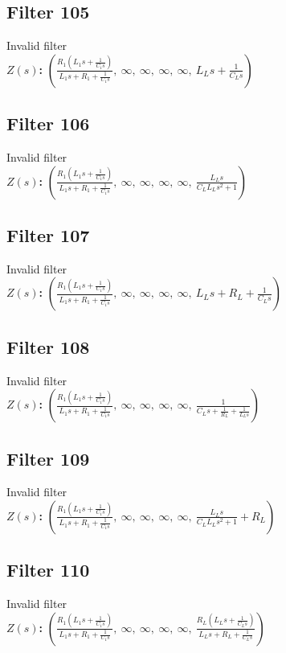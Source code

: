 \documentclass{article}
\begin{document}
\subsection*{Filter 105}
Invalid filter \\ 
\textbf{$Z(s)$:} $\left( \frac{R_{1} \left(L_{1} s + \frac{1}{C_{1} s}\right)}{L_{1} s + R_{1} + \frac{1}{C_{1} s}}, \  \infty, \  \infty, \  \infty, \  \infty, \  L_{L} s + \frac{1}{C_{L} s}\right)$ \\ 
\subsection*{Filter 106}
Invalid filter \\ 
\textbf{$Z(s)$:} $\left( \frac{R_{1} \left(L_{1} s + \frac{1}{C_{1} s}\right)}{L_{1} s + R_{1} + \frac{1}{C_{1} s}}, \  \infty, \  \infty, \  \infty, \  \infty, \  \frac{L_{L} s}{C_{L} L_{L} s^{2} + 1}\right)$ \\ 
\subsection*{Filter 107}
Invalid filter \\ 
\textbf{$Z(s)$:} $\left( \frac{R_{1} \left(L_{1} s + \frac{1}{C_{1} s}\right)}{L_{1} s + R_{1} + \frac{1}{C_{1} s}}, \  \infty, \  \infty, \  \infty, \  \infty, \  L_{L} s + R_{L} + \frac{1}{C_{L} s}\right)$ \\ 
\subsection*{Filter 108}
Invalid filter \\ 
\textbf{$Z(s)$:} $\left( \frac{R_{1} \left(L_{1} s + \frac{1}{C_{1} s}\right)}{L_{1} s + R_{1} + \frac{1}{C_{1} s}}, \  \infty, \  \infty, \  \infty, \  \infty, \  \frac{1}{C_{L} s + \frac{1}{R_{L}} + \frac{1}{L_{L} s}}\right)$ \\ 
\subsection*{Filter 109}
Invalid filter \\ 
\textbf{$Z(s)$:} $\left( \frac{R_{1} \left(L_{1} s + \frac{1}{C_{1} s}\right)}{L_{1} s + R_{1} + \frac{1}{C_{1} s}}, \  \infty, \  \infty, \  \infty, \  \infty, \  \frac{L_{L} s}{C_{L} L_{L} s^{2} + 1} + R_{L}\right)$ \\ 
\subsection*{Filter 110}
Invalid filter \\ 
\textbf{$Z(s)$:} $\left( \frac{R_{1} \left(L_{1} s + \frac{1}{C_{1} s}\right)}{L_{1} s + R_{1} + \frac{1}{C_{1} s}}, \  \infty, \  \infty, \  \infty, \  \infty, \  \frac{R_{L} \left(L_{L} s + \frac{1}{C_{L} s}\right)}{L_{L} s + R_{L} + \frac{1}{C_{L} s}}\right)$ \\ 
\end{document}
